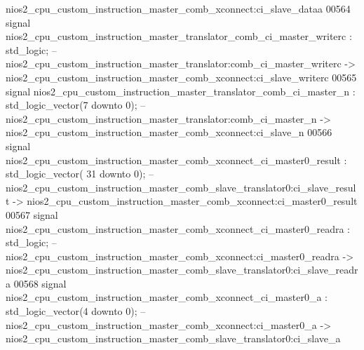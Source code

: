 \begin{DoxyCode}
{       nios2\_cpu\_custom\_instruction\_master\_comb\_xconnect:ci\_slave\_dataa}
00564     \textcolor{keywordflow}{signal} \textcolor{vhdlchar}{nios2_cpu_custom_instruction_master_translator_comb_ci_master_writerc}       \textcolor{vhdlchar}{:} \textcolor{comment}{std\_logic};\textcolor{keyword}{        
                   -- nios2\_cpu\_custom\_instruction\_master\_translator:comb\_ci\_master\_writerc ->
       nios2\_cpu\_custom\_instruction\_master\_comb\_xconnect:ci\_slave\_writerc}
00565     \textcolor{keywordflow}{signal} \textcolor{vhdlchar}{nios2_cpu_custom_instruction_master_translator_comb_ci_master_n}             \textcolor{vhdlchar}{:} \textcolor{comment}{std\_logic\_vector}\textcolor{vhdlchar}{(}\textcolor{vhdllogic}{}\textcolor{vhdllogic}{7}
       \textcolor{keywordflow}{downto} \textcolor{vhdllogic}{}\textcolor{vhdllogic}{0}\textcolor{vhdlchar}{)};\textcolor{keyword}{  -- nios2\_cpu\_custom\_instruction\_master\_translator:comb\_ci\_master\_n ->
       nios2\_cpu\_custom\_instruction\_master\_comb\_xconnect:ci\_slave\_n}
00566     \textcolor{keywordflow}{signal} \textcolor{vhdlchar}{nios2_cpu_custom_instruction_master_comb_xconnect_ci_master0_result}         \textcolor{vhdlchar}{:} \textcolor{comment}{std\_logic\_vector}\textcolor{vhdlchar}{(}\textcolor{vhdllogic}{}\textcolor{vhdllogic}{
      31} \textcolor{keywordflow}{downto} \textcolor{vhdllogic}{}\textcolor{vhdllogic}{0}\textcolor{vhdlchar}{)};\textcolor{keyword}{ -- nios2\_cpu\_custom\_instruction\_master\_comb\_slave\_translator0:ci\_slave\_result ->
       nios2\_cpu\_custom\_instruction\_master\_comb\_xconnect:ci\_master0\_result}
00567     \textcolor{keywordflow}{signal} \textcolor{vhdlchar}{nios2_cpu_custom_instruction_master_comb_xconnect_ci_master0_readra}         \textcolor{vhdlchar}{:} \textcolor{comment}{std\_logic};\textcolor{keyword}{        
                   -- nios2\_cpu\_custom\_instruction\_master\_comb\_xconnect:ci\_master0\_readra ->
       nios2\_cpu\_custom\_instruction\_master\_comb\_slave\_translator0:ci\_slave\_readra}
00568     \textcolor{keywordflow}{signal} \textcolor{vhdlchar}{nios2_cpu_custom_instruction_master_comb_xconnect_ci_master0_a}              \textcolor{vhdlchar}{:} \textcolor{comment}{std\_logic\_vector}\textcolor{vhdlchar}{(}\textcolor{vhdllogic}{}\textcolor{vhdllogic}{4}
       \textcolor{keywordflow}{downto} \textcolor{vhdllogic}{}\textcolor{vhdllogic}{0}\textcolor{vhdlchar}{)};\textcolor{keyword}{  -- nios2\_cpu\_custom\_instruction\_master\_comb\_xconnect:ci\_master0\_a ->
       nios2\_cpu\_custom\_instruction\_master\_comb\_slave\_translator0:ci\_slave\_a}

\end{DoxyCode}
